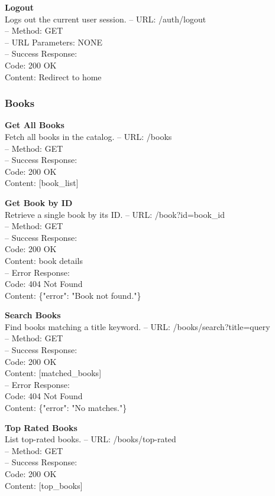 \textbf{Logout} \\
Logs out the current user session.
– URL: /auth/logout \\
– Method: GET \\
– URL Parameters: NONE \\
– Success Response: \\
Code: 200 OK \\
Content: Redirect to home

\subsubsection*{Books}

\textbf{Get All Books} \\
Fetch all books in the catalog.
– URL: /books \\
– Method: GET \\
– Success Response: \\
Code: 200 OK \\
Content: [book_list]

\textbf{Get Book by ID} \\
Retrieve a single book by its ID.
– URL: /book?id={book_id} \\
– Method: GET \\
– Success Response: \\
Code: 200 OK \\
Content: {book details} \\
– Error Response: \\
Code: 404 Not Found \\
Content: \{"error": "Book not found."\}

\textbf{Search Books} \\
Find books matching a title keyword.
– URL: /books/search?title={query} \\
– Method: GET \\
– Success Response: \\
Code: 200 OK \\
Content: [matched_books] \\
– Error Response: \\
Code: 404 Not Found \\
Content: \{"error": "No matches."\}

\textbf{Top Rated Books} \\
List top-rated books.
– URL: /books/top-rated \\
– Method: GET \\
– Success Response: \\
Code: 200 OK \\
Content: [top_books]

